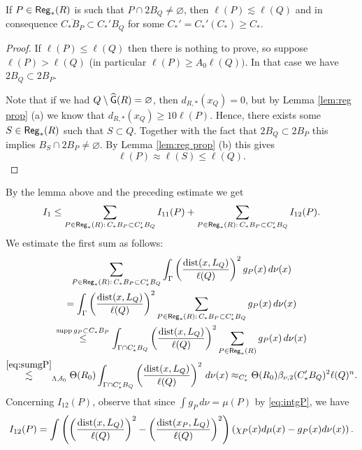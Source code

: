 \begin{lemma}\label{lem:PsizeQ}
	If $P\in{\mathsf{Reg}}_*(R)$ is such that $P\cap 2B_Q\neq\varnothing$, then $\ell(P)\lesssim\ell(Q)$ and in consequence $\overline{C_*B_P}\subset C_*'B_Q$ for some $C_*'=C_*'(C_*)\ge C_*$.
\end{lemma}
\begin{proof}
	If $\ell(P)\le\ell(Q)$ then there is nothing to prove, so suppose $\ell(P)>\ell(Q)$ (in particular $\ell(P)\ge A_0\ell(Q))$. In that case we have $2B_Q\subset 2B_P$. 
	
	Note that if we had $Q\setminus{\widehat{{\mathsf G}}}(R)=\varnothing$, then $d_{R,*}(x_Q)=0$, but by Lemma \ref{lem:reg prop} (a) we know that $d_{R,*}(x_Q)\ge 10\ell(P)$.
	Hence, there exists some $S\in{\mathsf{Reg}}_*(R)$ such that $S\subset Q$. Together with the fact that $2B_Q\subset 2B_P$ this implies $B_S\cap 2B_P\neq\varnothing$. By Lemma \ref{lem:reg prop} (b) this gives
	\begin{equation*}
	\ell(P)\approx \ell(S)\le\ell(Q).
	\end{equation*}
\end{proof}
By the lemma above and the preceding estimate we get
\begin{equation}\label{eq:bet4}
I_1 \le \sum_{P\in{\mathsf{Reg}}_*(R) :\,  C_*B_P\subset C_*'B_Q} I_{11}(P) + \sum_{P\in{\mathsf{Reg}}_*(R) :\,  C_*B_P\subset C_*'B_Q} I_{12}(P).
\end{equation}
We estimate the first sum as follows:
\begin{multline}\label{eq:bet5}
\sum_{P\in{\mathsf{Reg}}_*(R) :\,  C_*B_P\subset C_*'B_Q} \int_{\Gamma} \left(\frac{{\rm dist}(x,L_Q)}{\ell(Q)}\right)^2 g_P(x)\,d\nu(x)\\
=  \int_{\Gamma} \left(\frac{{\rm dist}(x,L_Q)}{\ell(Q)}\right)^2 \sum_{P\in{\mathsf{Reg}}_*(R) :\,  C_*B_P\subset C_*'B_Q}  g_P(x)\,d\nu(x)\\
\overset{{\operatorname{supp} g_P\subset C_* B_P}}{\le} \int_{\Gamma\cap C_*'B_Q} \left(\frac{{\rm dist}(x,L_Q)}{\ell(Q)}\right)^2 \sum_{P\in{\mathsf{Reg}}_*(R)}  g_P(x)\,d\nu(x)\\
\overset{\eqref{eq:sumgP}}{\lesssim}_{\Lambda,\delta_0}\Theta(R_0)\int_{\Gamma\cap C_*'B_Q} \left(\frac{{\rm dist}(x,L_Q)}{\ell(Q)}\right)^2\,d\nu(x)\approx_{C_*'} \Theta(R_0)\beta_{\nu,2}(C_*'B_Q)^2\ell(Q)^n.
\end{multline}
Concerning $I_{12}(P)$, observe that since $\int g_P\, d\nu=\mu(P)$ by \eqref{eq:intgP}, we have
\begin{equation*}
I_{12}(P) = \int \left(\left(\frac{{\rm dist}(x,L_Q)}{\ell(Q)}\right)^2 - \left(\frac{{\rm dist}(x_P,L_Q)}{\ell(Q)}\right)^2\right) \left(\chi_{P}(x)d\mu(x) - g_P(x)d\nu(x)\right).
\end{equation*}
